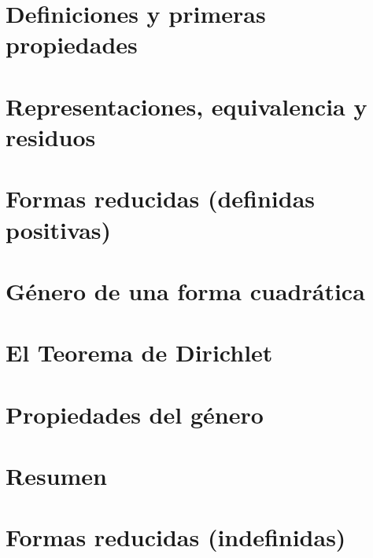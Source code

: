 \section{Definiciones y primeras propiedades}\label{sec:definiciones}


\section{Representaciones, equivalencia y residuos}\label{sec:representaciones}


\section{Formas reducidas (definidas positivas)}\label{sec:reducidas}


\section{G\'enero de una forma cuadr\'atica}\label{sec:generos:a}


\section{El Teorema de Dirichlet}\label{sec:dirichlet}


\section{Propiedades del g\'enero}\label{sec:generos:b}


\section{Resumen}\label{sec:resumen}


\section{Formas reducidas (indefinidas)}\label{sec:reducidas:indefinidas}


